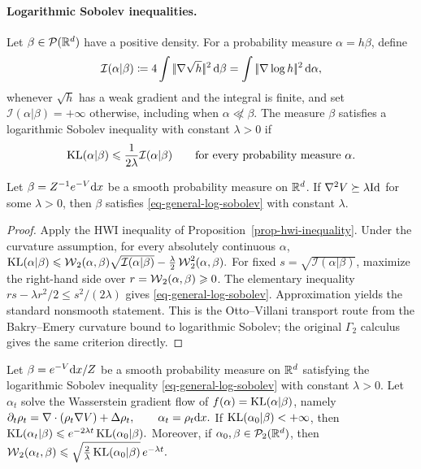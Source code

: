 \paragraph{Logarithmic Sobolev inequalities.}
\begin{defn}\label{def-relative-fisher-lsi}
Let \(\beta\in\mathcal{P}(\mathbb{R}^d)\) have a positive density. For a probability measure \(\alpha=h\beta\), define
\begin{equation}\label{eq-relative-fisher-information}
\mathcal I(\alpha|\beta)
\coloneqq
4\int |\!| \nabla\sqrt h |\!|^2\,\mathrm{d}\beta
=
\int |\!| \nabla\log h |\!|^2\,\mathrm{d}\alpha,
\end{equation}
whenever $\sqrt h$ has a weak gradient and the integral is finite, and set \(\mathcal I(\alpha|\beta)=+\infty\) otherwise, including when \(\alpha\not\ll\beta\). The measure \(\beta\) satisfies a logarithmic Sobolev inequality with constant \(\lambda>0\) if
\begin{equation}\label{eq-general-log-sobolev}
\operatorname{KL}(\alpha|\beta)
\leqslant
\frac{1}{2\lambda}\mathcal I(\alpha|\beta)
\qquad
\text{for every probability measure }\alpha.
\end{equation}
\end{defn}
\begin{prop}\label{prop-curvature-log-sobolev}
Let \(\beta=Z^{-1}e^{-V}\mathrm{d} x\) be a smooth probability measure on \(\mathbb{R}^d\). If \(\nabla^2V\succeq\lambda\mathrm{Id}\) for some \(\lambda>0\), then \(\beta\) satisfies \eqref{eq-general-log-sobolev} with constant \(\lambda\).
\end{prop}
\begin{proof}
Apply the HWI inequality of Proposition~\ref{prop-hwi-inequality}. Under the curvature assumption, for every absolutely continuous \(\alpha\),
\(\operatorname{KL}(\alpha|\beta) \leqslant \operatorname{\mathcal{W}}_2(\alpha,\beta)\sqrt{\mathcal I(\alpha|\beta)} - \frac{\lambda}{2}\operatorname{\mathcal{W}}_2^2(\alpha,\beta).\)
For fixed \(s=\sqrt{\mathcal I(\alpha|\beta)}\), maximize the right-hand side over \(r=\operatorname{\mathcal{W}}_2(\alpha,\beta)\geqslant0\). The elementary inequality \(rs-\lambda r^2/2\leq s^2/(2\lambda)\) gives \eqref{eq-general-log-sobolev}. Approximation yields the standard nonsmooth statement. This is the Otto--Villani transport route from the Bakry--Emery curvature bound to logarithmic Sobolev; the original \(\Gamma_2\) calculus gives the same criterion directly.
\end{proof}
\begin{prop}\label{prop-lsi-entropy-decay}
Let \(\beta=e^{-V}\mathrm{d} x/Z\) be a smooth probability measure on \(\mathbb{R}^d\) satisfying the logarithmic Sobolev inequality \eqref{eq-general-log-sobolev} with constant \(\lambda>0\). Let \(\alpha_t\) solve the Wasserstein gradient flow of \(f(\alpha)=\operatorname{KL}(\alpha|\beta)\), namely
\(\partial_t\rho_t = \nabla\cdot(\rho_t\nabla V)+\Delta\rho_t, \qquad \alpha_t=\rho_t\mathrm{d} x.\)
If \(\operatorname{KL}(\alpha_0|\beta)<+\infty\), then
\(\operatorname{KL}(\alpha_t|\beta) \leqslant e^{-2\lambda t}\operatorname{KL}(\alpha_0|\beta).\)
Moreover, if \(\alpha_0,\beta\in\mathcal{P}_2(\mathbb{R}^d)\), then
\(\operatorname{\mathcal{W}}_2(\alpha_t,\beta) \leqslant \sqrt{\frac{2}{\lambda}\operatorname{KL}(\alpha_0|\beta)}\,e^{-\lambda t}.\)
\end{prop}
